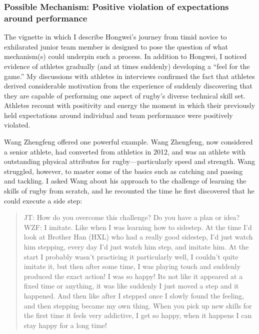 \begin{CJK}{UTF8}{gbsn}





\subsubsection{Possible Mechanism: Positive violation of expectations around performance}

The vignette in which I describe Hongwei's journey from timid novice to exhilarated junior team member is designed to pose the question of what mechanism(s) could underpin such a process.  In addition to Hongwei, I noticed evidence of athletes gradually (and at times suddenly) developing a ``feel for the game.''  My discussions with athletes in interviews confirmed the fact that athletes derived considerable motivation from the experience of suddenly discovering that they are capable of performing one aspect of rugby's diverse technical skill set.  Athletes recount with positivity and energy the moment in which their previously held expectations around individual and team performance were positively violated.

Wang Zhengfeng offered one powerful example.  Wang Zhengfeng, now considered a senior athlete, had converted from athletics in 2012, and was an athlete with outstanding physical attributes for rugby---particularly speed and strength. Wang struggled, however, to master some of the basics such as catching and passing and tackling.  I asked Wang about his approach to the challenge of learning the skills of rugby from scratch, and he recounted the time he first discovered that he could execute a side step:

    \begin{quotation}
      JT: How do you overcome this challenge? Do you have a plan or idea? \\
      WZF: I imitate.  Like when I was learning how to sidestep. At the time I’d look at Brother Han (HXL) who had a really good sidestep, I'd just watch him stepping, every day I'd just watch him step, and imitate him.  At the start I probably wasn't practicing it particularly well, I couldn't quite imitate it, but then after some time, I was playing touch and suddenly produced the exact action! I was so happy! Its not like it appeared at a fixed time or anything, it was like suddenly I just moved a step and it happened. And then like after I stepped once I slowly found the feeling, and then stepping became my own thing.  When you pick up new skills for the first time it feels very addictive, I get so happy, when it happens I can stay happy for a long time!
    \end{quotation}


\end{CJK}
